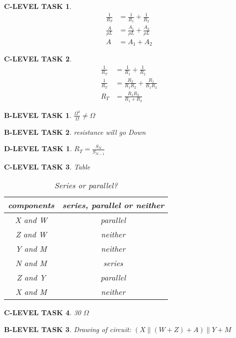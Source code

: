 \documentclass{book}
\numberwithin{equation}{section}
\newtheorem{blevel}{B-LEVEL TASK}
\newtheorem{clevel}{C-LEVEL TASK}
\newtheorem{dlevel}{D-LEVEL TASK}
\theoremstyle{definition}
\begin{document}
\begin{clevel} \begin{align*}
\frac{1}{R_T}&=\frac{1}{R_1}+\frac{1}{R_2}\\
\frac{A}{\rho L}&=\frac{A_1}{\rho L}+\frac{A_2}{\rho L}\\
A&=A_1+A_2
\end{align*}
\end{clevel}

\begin{clevel} \begin{align*}
\frac{1}{R_T}&=\frac{1}{R_1}+\frac{1}{R_2}\\
\frac{1}{R_T}&=\frac{R_2}{R_1R_2}+\frac{R_1}{R_1R_2}\\
R_T&=\frac{R_1R_2}{R_1+R_2}
\end{align*}
\end{clevel}

\begin{blevel} $\frac{\Omega^3}{\Omega} \neq \Omega$
\end{blevel}

\begin{blevel} resistance will go Down\end{blevel}

\begin{dlevel} $R_T=\frac{S_N}{S_{N-1}}$\end{dlevel}

\begin{clevel} Table\par 
\begin{table}[H]
\begin{center}
\begin{tabular}{|c|c|} \hline
components & series, parallel or neither \\ \hline
X and W & parallel	\\ \hline
Z and W &neither	\\ \hline
Y and M &neither	\\ \hline
N and M &series	\\ \hline
Z and Y &parallel	\\ \hline
X and M &neither	\\ \hline
\end{tabular}
\caption{Series or parallel?}
\label{T:3SP}
\end{center}
\end{table}
\end{clevel}

\begin{clevel}30 $\Omega$\end{clevel}
\begin{blevel} Drawing of circuit: $(X \parallel (W+Z)+A)\parallel Y+M$\end{blevel}
\end{document}
